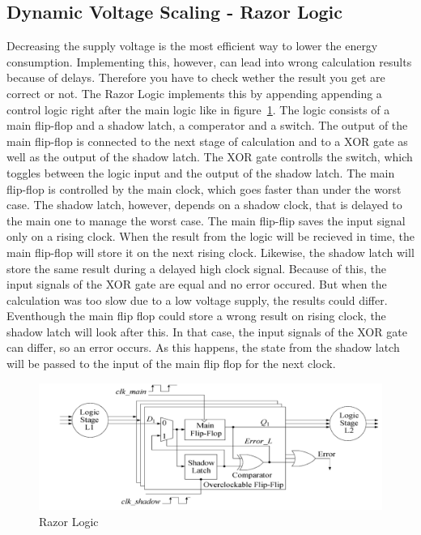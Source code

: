 \documentclass[12pt, a4paper]{article}
\begin{document}
	\subsection{Dynamic Voltage Scaling - Razor Logic}
	Decreasing the supply voltage is the most efficient way to lower the energy consumption. Implementing this, however, can lead into wrong calculation results because of delays. Therefore you have to check wether the result you get are correct or not. 
	The Razor Logic implements this by appending appending a control logic right after the main logic like in figure~\ref{fig:razor}. The logic consists of a main flip-flop and a shadow latch, a comperator and a switch. The output of the main flip-flop is connected to the next stage of calculation and to a XOR gate as well as the output of the shadow latch. The XOR gate controlls the switch, which toggles between the logic input and the output of the shadow latch.
	\newline
	The main flip-flop is controlled by the main clock, which goes faster than under the worst case. The shadow latch, however, depends on a shadow clock, that is delayed to the main one to manage the worst case. The main flip-flip saves the input signal only on a rising clock. When the result from the logic will be recieved in time, the main flip-flop will store it on the next rising clock. Likewise, the shadow latch will store the same result during a delayed high clock signal. Because of this, the input signals of the XOR gate are equal and no error occured. But when the calculation was too slow due to a low voltage supply, the results could differ. Eventhough the main flip flop could store a wrong result on rising clock, the shadow latch will look after this. In that case, the input signals of the XOR gate can differ, so an error occurs. As this happens, the state from the shadow latch will be passed to the input of the main flip flop for the next clock.\cite{austin}\cite{chinese}\cite{book}
	\begin{figure}[ht]
		\begin{center}
			\includegraphics[width=12cm]{razor.png}
		\end{center}
		\caption{Razor Logic\cite{chinese}
			\label{fig:razor}}
	\end{figure}
\end{document}
